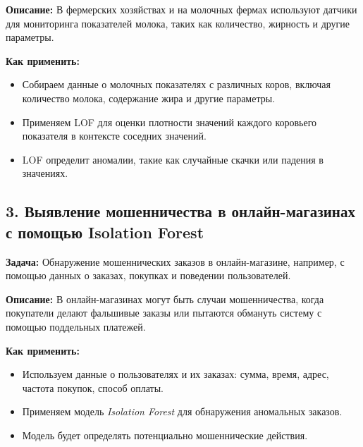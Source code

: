 \textbf{Описание:} В фермерских хозяйствах и на молочных фермах используют датчики для мониторинга показателей молока, таких как количество, жирность и другие параметры.

\textbf{Как применить:}
\begin{itemize}
    \item Собираем данные о молочных показателях с различных коров, включая количество молока, содержание жира и другие параметры.
    \item Применяем LOF для оценки плотности значений каждого коровьего показателя в контексте соседних значений.
    \item LOF определит аномалии, такие как случайные скачки или падения в значениях.
\end{itemize}

\subsection{3. Выявление мошенничества в онлайн-магазинах с помощью Isolation Forest}
\textbf{Задача:} Обнаружение мошеннических заказов в онлайн-магазине, например, с помощью данных о заказах, покупках и поведении пользователей.

\textbf{Описание:} В онлайн-магазинах могут быть случаи мошенничества, когда покупатели делают фальшивые заказы или пытаются обмануть систему с помощью поддельных платежей.

\textbf{Как применить:}
\begin{itemize}
    \item Используем данные о пользователях и их заказах: сумма, время, адрес, частота покупок, способ оплаты.
    \item Применяем модель \textit{Isolation Forest} для обнаружения аномальных заказов.
    \item Модель будет определять потенциально мошеннические действия.
\end{itemize}

